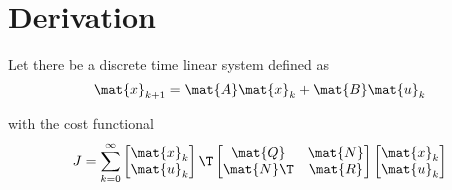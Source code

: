 \section{Derivation}

Let there be a discrete time linear \gls{system} defined as
\begin{equation}
  \mat{x}_{k+1} = \mat{A}\mat{x}_k + \mat{B}\mat{u}_k
\end{equation}

with the cost functional
\begin{equation*}
  J = \sum_{k=0}^\infty
    \begin{bmatrix}
      \mat{x}_k \\
      \mat{u}_k
    \end{bmatrix}\T
    \begin{bmatrix}
      \mat{Q} & \mat{N} \\
      \mat{N}\T & \mat{R}
    \end{bmatrix}
    \begin{bmatrix}
      \mat{x}_k \\
      \mat{u}_k
    \end{bmatrix}
\end{equation*}

